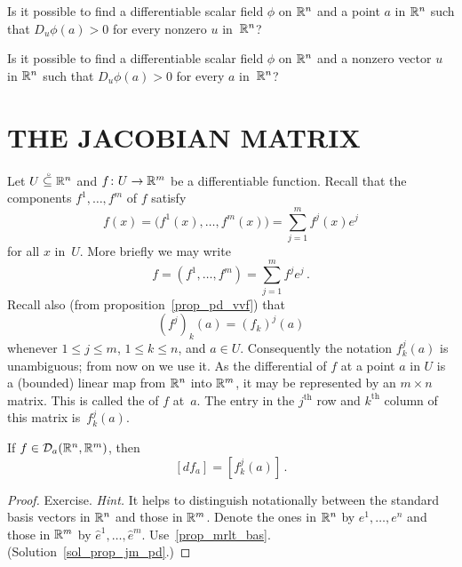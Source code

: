 \begin{prob}  Is it possible to find a differentiable scalar field $\phi$ on $\mathbb{R}^n$ and a point
$a$ in $\mathbb{R}^n$ such that $D_u\phi(a) > 0$ for every nonzero $u$ in~$\mathbb{R}^n$?
\end{prob}

\begin{prob}  Is it possible to find a differentiable scalar field $\phi$ on $\mathbb{R}^n$ and a nonzero
vector $u$ in $\mathbb{R}^n$ such that $D_u\phi(a) > 0$ for every $a$ in~$\mathbb{R}^n$?
\end{prob}









\section{THE JACOBIAN MATRIX}
\begin{defn} Let $U\overset{\thickspace{}_\circ}{\subseteq}\mathbb{R}^n$ and $f\colon U \rightarrow \mathbb{R}^m$ be a differentiable function.  Recall
that the components $f^1, \dots, f^m$ of $f$ satisfy
  \[ f(x) = \bigl(f^1(x), \dots, f^m(x)\bigr) = \sum_{j=1}^m f^j(x) e^j \]
for all $x$ in~$U$.  More briefly we may write
  \[ f = (f^1, \dots, f^m) = \sum_{j=1}^m f^j e^j\,. \]
Recall also (from proposition~\ref{prop_pd_vvf}) that
  \[ (f^j)_k(a)  =  (f_k)^j(a) \]
whenever $1 \le j \le m$, $1 \le k \le n$, and $a \in U$. Consequently the notation $f_k^j(a)$
is unambiguous; from now on we use it.  As the differential of $f$ at a point $a$ in $U$ is a
(bounded) linear map from $\mathbb{R}^n$ into $\mathbb{R}^m$, it may be represented by an $m \times n$ matrix.
This is called the
 of $f$ at~$a$.  The entry in the $j^{\text{th}}$ row and $k^{\text{th}}$
column of this matrix is~$f_k^j(a)$.
\end{defn}

\begin{prop}\label{prop_jm_pd} If $f \in \mathcal{D}_a(\mathbb{R}^n,\mathbb{R}^m)$, then
  \[ [df_a] = [f_k^j(a)]\,. \]
\end{prop}

\begin{proof} Exercise. \emph{Hint.} It helps to distinguish notationally between the standard
basis vectors in $\mathbb{R}^n$ and those in $\mathbb{R}^m$.  Denote the ones in $\mathbb{R}^n$ by $e^1, \dots, e^n$
and those in $\mathbb{R}^m$ by $\hat e^1, \dots, \hat e^m$. Use~\ref{prop_mrlt_bas}.
(Solution~\ref{sol_prop_jm_pd}.)  \ns
\end{proof}

